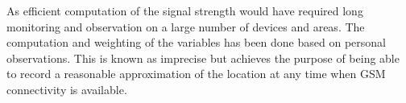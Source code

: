 As efficient computation of the signal strength would have required long monitoring and observation on a large number of devices and areas.
The computation and weighting of the variables has been done based on personal observations.
This is known as imprecise but achieves the purpose of being able to record a reasonable approximation of the location at any time when GSM connectivity is available.\\


